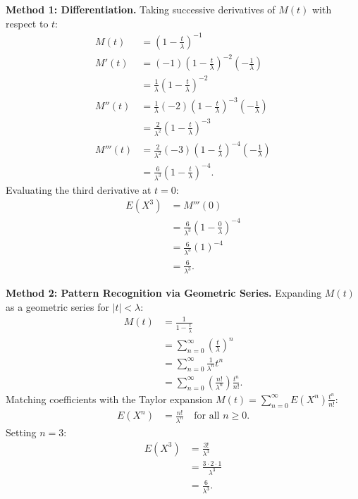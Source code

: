 \documentclass[11pt,a4paper]{article}
\begin{document}
\noindent \textbf{Method 1: Differentiation.} Taking successive derivatives of $M(t)$ with respect to $t$:
\begin{align*}
M(t) &= \left( 1 - \frac{t}{\lambda} \right)^{-1} \\
M'(t) &= (-1)\left( 1 - \frac{t}{\lambda} \right)^{-2} \left( -\frac{1}{\lambda} \right) \\
&= \frac{1}{\lambda} \left( 1 - \frac{t}{\lambda} \right)^{-2} \\
M''(t) &= \frac{1}{\lambda}(-2)\left( 1 - \frac{t}{\lambda} \right)^{-3} \left( -\frac{1}{\lambda} \right) \\
&= \frac{2}{\lambda^2} \left( 1 - \frac{t}{\lambda} \right)^{-3} \\
M'''(t) &= \frac{2}{\lambda^2}(-3)\left( 1 - \frac{t}{\lambda} \right)^{-4} \left( -\frac{1}{\lambda} \right) \\
&= \frac{6}{\lambda^3} \left( 1 - \frac{t}{\lambda} \right)^{-4}.
\end{align*}
Evaluating the third derivative at $t = 0$:
\begin{align*}
E(X^3) &= M'''(0) \\
&= \frac{6}{\lambda^3} \left( 1 - \frac{0}{\lambda} \right)^{-4} \\
&= \frac{6}{\lambda^3} (1)^{-4} \\
&= \frac{6}{\lambda^3}.
\end{align*}

\noindent \textbf{Method 2: Pattern Recognition via Geometric Series.} Expanding $M(t)$ as a geometric series for $|t| < \lambda$:
\begin{align*}
M(t) &= \frac{1}{1 - \frac{t}{\lambda}} \\
&= \sum_{n=0}^{\infty} \left( \frac{t}{\lambda} \right)^n \\
&= \sum_{n=0}^{\infty} \frac{1}{\lambda^n} t^n \\
&= \sum_{n=0}^{\infty} \left( \frac{n!}{\lambda^n} \right) \frac{t^n}{n!}.
\end{align*}
Matching coefficients with the Taylor expansion $M(t) = \sum_{n=0}^{\infty} E(X^n) \frac{t^n}{n!}$:
\begin{align*}
E(X^n) &= \frac{n!}{\lambda^n} \quad \text{for all } n \ge 0.
\end{align*}
Setting $n = 3$:
\begin{align*}
E(X^3) &= \frac{3!}{\lambda^3} \\
&= \frac{3 \cdot 2 \cdot 1}{\lambda^3} \\
&= \frac{6}{\lambda^3}.
\end{align*}
\end{document}
